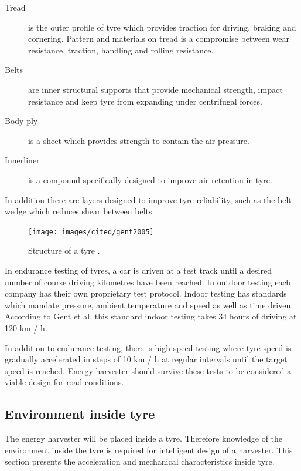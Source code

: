 \begin{description}
  \item[Tread] is the outer profile of tyre which provides traction for driving, braking and cornering. Pattern and materials on
tread is a compromise between wear resistance, traction, handling and rolling
resistance.
  \item[Belts] are inner structural supports that provide mechanical strength, impact resistance and keep tyre from expanding
under centrifugal forces.
  \item[Body ply] is a sheet which provides strength to contain the air pressure.
  \item[Innerliner] is a compound specifically designed to improve air retention in tyre.
\end{description}
In addition there are layers designed to improve tyre reliability, such as the belt
wedge which reduces shear between belts. 


\begin{figure}[h]
\begin{center}
\texttt{[image: images/cited/gent2005]}
\end{center}
\caption{Structure of a tyre \cite{Gent2005}.}
\label{fig:tyre_structure_diagram}
\end{figure}


In endurance testing of tyres, a car is driven at a test track until
a desired number of course driving kilometres have been reached. In outdoor testing
each company has their own proprietary test protocol. Indoor testing has standards
which mandate pressure, ambient temperature and speed as well as time driven.
According to Gent et al. \cite{Gent2005} this standard indoor testing takes 34 hours of driving at 120
km / h.

In addition to endurance testing, there is high-speed testing where tyre speed is
gradually accelerated in steps of 10 km / h at regular intervals until the target speed is
reached. Energy harvester should survive these tests to be considered a viable design for road conditions.


\subsection{Environment inside tyre} \label{sect:tyre_environment}
The energy harvester will be placed inside a tyre. Therefore knowledge of the environment inside the tyre is required for intelligent design of a harvester. This section presents the acceleration and mechanical characteristics inside tyre. 

